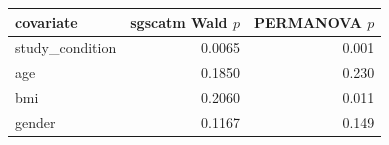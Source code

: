 \begin{tabular}{lrr}
\toprule
covariate & sgscatm Wald $p$ & PERMANOVA $p$ \\
\midrule
study_condition & 0.0065 & 0.001 \\
age & 0.1850 & 0.230 \\
bmi & 0.2060 & 0.011 \\
gender & 0.1167 & 0.149 \\
\bottomrule
\end{tabular}

